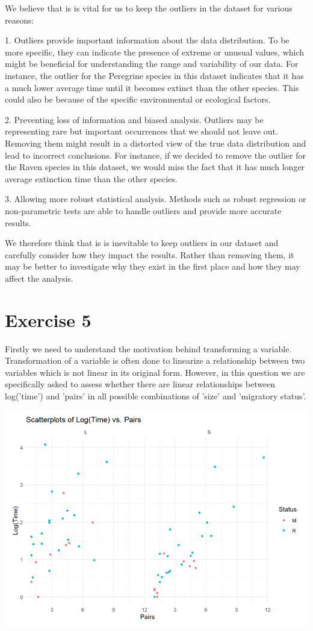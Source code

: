 \documentclass{article}
\begin{document}
We believe that is is vital for us to keep the outliers in the dataset for various reasons:

1. Outliers provide important information about the data distribution. To be more specific, they can indicate the presence of extreme or unusual values, which might be beneficial for understanding the range and variability of our data. For instance,  the outlier for the Peregrine species in this dataset indicates that it has a much lower average time until it becomes extinct than the other species. This could also be because of the specific environmental or ecological factors.

2. Preventing loss of information and biased analysis. Outliers may be representing rare but important occurrences that we should not leave out. Removing them might result in a distorted view of the true data distribution and lead to incorrect conclusions. For instance, if we decided to remove the outlier for the Raven species in this dataset, we would miss the fact that it has much longer average extinction time than the other species.

3. Allowing more robust statistical analysis. Methods such as robust regression or non-parametric tests are able to handle outliers and provide more accurate results.

We therefore think that is is inevitable to keep outliers in our dataset and carefully consider how they impact the results. Rather than removing them, it may be better to investigate why they exist in the first place and how they may affect the analysis.


\section{Exercise 5}
Firstly we need to understand the motivation behind transforming a variable. Transformation of a variable is often done to linearize a relationship between two variables which is not linear in its original form. However, in this question we are specifically asked to assess whether there are linear relationships between log('time') and 'pairs' in all possible combinations of 'size' and 'migratory status'.

\begin{center}
\includegraphics[scale=0.5]{graphs/graph5.png}
\end{center}
\end{document}

